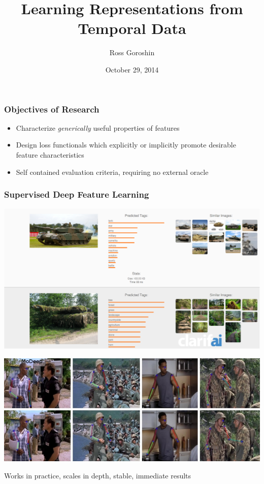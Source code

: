 \documentclass{beamer}
\title{Learning Representations from Temporal Data}
\date{October 29, 2014}
\author{Ross Goroshin}
\begin{document}
\begin{frame}
\titlepage
\end{frame}


\begin{frame}
\frametitle{Objectives of Research}  
\begin{itemize}
\item Characterize \emph{generically} useful properties of features  
\item Design loss functionals which explicitly or implicitly promote desirable feature characteristics 
\item Self contained evaluation criteria, requiring no external oracle
\end{itemize}
\end{frame}

\begin{frame}
\frametitle{Supervised Deep Feature Learning} 
\centerline{\includegraphics[scale=0.1]{./images/clarifai.png}} 
\centerline{\includegraphics[scale=0.2]{./images/modeep.jpg}}
\centerline{Works in practice, scales in depth, stable, immediate results} 
\end{frame}
\end{document}
